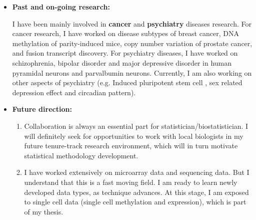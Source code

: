 \documentclass[a4paper, 10pt]{article}
\begin{document}
\begin{itemize}
\item \textbf{Past and on-going research:}

I have been mainly involved in \textbf{cancer} and \textbf{psychiatry} diseases research.
For cancer research, I have worked on disease subtypes of breast cancer\cite{ref:ILC},
DNA methylation of parity-induced mice\cite{ref:mouseParity}, 
copy number variation of prostate cancer\cite{ref:prostate},
and fusion transcript discovery\cite{ref:fusionGene}.
For psychiatry diseases,
I have worked on schizophrenia, bipolar disorder and major depressive disorder in human pyramidal neurons\cite{ref:MO1} and parvalbumin neurons\cite{ref:PVL3}.
Currently, I am also working on other aspects of psychiatry (e.g. Induced pluripotent stem cell \cite{ref:iPSC}, sex related depression effect and circadian pattern).

\item \textbf{Future direction:}
\begin{enumerate}
\item Collaboration is always an essential part for statistician/biostatistician.
I will definitely seek for opportunities to work with local biologists in my future tenure-track research environment, 
which will in turn motivate statistical methodology development.
\item I have worked extensively on microarray data and sequencing data.
But I understand that this is a fast moving field.
I am ready to learn newly developed data types, as technique advances.
At this stage, I am exposed to single cell data (single cell methylation and expression),
which is part of my thesis.
\end{enumerate}
\end{itemize}
\end{document}
